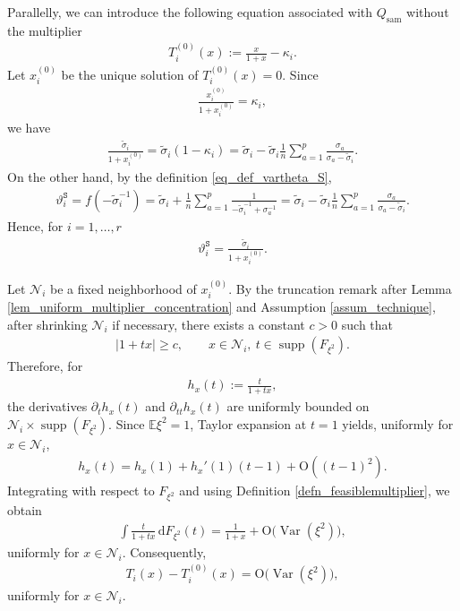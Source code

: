 \documentclass[12pt]{article}
\theoremstyle{plain}
\numberwithin{equation}{section}
\begin{document}
Parallelly, we can introduce the following equation associated with $Q_{\text{sam}}$ without the multiplier
\begin{align*}
	T_i^{(0)}(x):=\frac{x}{1+x}-\kappa_i.
\end{align*}
Let $x_i^{(0)}$ be the unique solution of $T_i^{(0)}(x)=0$. Since
\begin{align*}
	\frac{x_i^{(0)}}{1+x_i^{(0)}}=\kappa_i,
\end{align*}
we have
\begin{align*}
	\frac{\widetilde{\sigma}_i}{1+x_i^{(0)}}
	=
	\widetilde{\sigma}_i(1-\kappa_i)
	=
	\widetilde{\sigma}_i
	-
	\widetilde{\sigma}_i\frac{1}{n}\sum_{a=1}^p\frac{\sigma_a}{\sigma_a-\widetilde{\sigma}_i}.
\end{align*}
On the other hand, by the definition \eqref{eq_def_vartheta_S},
\begin{align*}
	\vartheta_i^{\mathtt{S}}
	=
	f(-\widetilde{\sigma}_i^{-1})
	=
	\widetilde{\sigma}_i
	+
	\frac{1}{n}\sum_{a=1}^p\frac{1}{-\widetilde{\sigma}_i^{-1}+\sigma_a^{-1}}
	=
	\widetilde{\sigma}_i
	-
	\widetilde{\sigma}_i\frac{1}{n}\sum_{a=1}^p\frac{\sigma_a}{\sigma_a-\widetilde{\sigma}_i}.
\end{align*}
Hence,  for $i=1,\dots, r$
\begin{align}\label{eq_power_gap_thetaS_rep}
	\vartheta_i^{\mathtt{S}}
	=
	\frac{\widetilde{\sigma}_i}{1+x_i^{(0)}}.
\end{align}

Let $\mathcal N_i$ be a fixed neighborhood of $x_i^{(0)}$. By the truncation remark after Lemma \ref{lem_uniform_multiplier_concentration} and Assumption \ref{assum_technique}, after shrinking $\mathcal N_i$ if necessary, there exists a constant $c>0$ such that
\begin{align}\label{eq_power_gap_den}
	|1+t x|\ge c,\qquad x\in\mathcal N_i,\ t\in \operatorname{supp}(F_{\xi^2}).
\end{align}
Therefore, for
\begin{align*}
	h_x(t):=\frac{t}{1+t x},
\end{align*}
the derivatives $\partial_t h_x(t)$ and $\partial_{tt} h_x(t)$ are uniformly bounded on $\mathcal N_i\times \operatorname{supp}(F_{\xi^2})$.
Since $\mathbb E\xi^2=1$, Taylor expansion at $t=1$ yields, uniformly for $x\in\mathcal N_i$,
\begin{align*}
	h_x(t)
	=
	h_x(1)+h_x'(1)(t-1)+\mathrm{O}((t-1)^2).
\end{align*}
Integrating with respect to $F_{\xi^2}$ and using Definition \ref{defn_feasiblemultiplier}, we obtain
\begin{align}\label{eq_power_gap_H}
	\int\frac{t}{1+t x}\,\mathrm{d}F_{\xi^2}(t)
	=
	\frac{1}{1+x}
	+
	\mathrm{O}\big(\operatorname{Var}(\xi^2)\big),
\end{align}
uniformly for $x\in\mathcal N_i$. Consequently,
\begin{align}\label{eq_power_gap_T}
	T_i(x)-T_i^{(0)}(x)
	=
	\mathrm{O}\big(\operatorname{Var}(\xi^2)\big),
\end{align}
uniformly for $x\in\mathcal N_i$.
\end{document}
